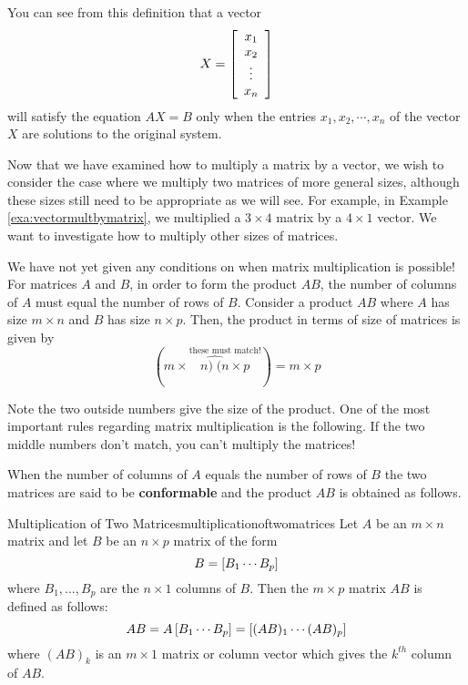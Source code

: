 You can see from this definition that a vector 
\begin{equation*}
X =
\left[
\begin{array}{c}
x_{1} \\
x_{2} \\
\vdots \\
x_{n}
\end{array}
\right]
\end{equation*}
will satisfy the equation $AX=B$
only when the entries $x_{1}, x_{2}, \cdots, x_{n}$ of the vector $X$ are solutions to the original system.

Now that we have examined how to multiply a matrix by a vector, we
wish to consider the case where we multiply two matrices of more
general sizes, although these sizes still need to be appropriate as we
will see. For example, in Example \ref{exa:vectormultbymatrix}, we
multiplied a $3 \times 4$ matrix by a $4 \times 1$ vector.  We want to
investigate how to multiply other sizes of matrices.

We have not yet given any conditions on when matrix multiplication is
possible!  For matrices $A$ and $B$, in order to form the product
$AB$, the number of columns of $A$ must equal the number of rows of
$B.$ Consider a product $AB$ where $A$ has size $m\times n$ and $B$
has size $n \times p$. Then, the product in terms of size of matrices
is given by
\begin{equation*}
(m\times\overset{\text{these must match!}}{\widehat{n)\;(n}\times p})=m\times p
\end{equation*}

Note the two outside numbers give the size of the product. One of the most important rules regarding matrix multiplication is the following. 
If the two middle numbers don't match, you can't multiply the
matrices!

When the number of columns of $A$ equals the number of rows
of $B$ the two matrices are said to be
\textbf{conformable} and the product
$AB$  is obtained as follows.

\begin{definition}{Multiplication of Two Matrices}{multiplicationoftwomatrices}
 Let $A$ be an $m\times n$ matrix
and let $B$ be an $n\times p$ matrix of the form
\begin{equation*}
B=\left[ B_{1} \cdots  B_{p}\right]
\end{equation*}
where $B_{1},...,B_{p}$ are the $n\times 1$ columns of $B$. Then the 
$m\times p$ matrix $AB$ is defined as follows:
\begin{equation*}
AB = A \left[ B_{1} \cdots  B_{p}\right] =  \left[ (A B)_{1} \cdots  (AB)_{p}\right] 
\end{equation*}
where $(AB)_{k}$ is an $m\times 1$ matrix or column vector which
gives the $k^{th}$ column of $AB$. 
\end{definition}

